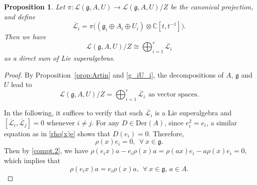 \documentclass[12pt]{article}
\numberwithin{equation}{section}
\newtheorem{proposition}[theorem]{Proposition}
\theoremstyle{definition}
\theoremstyle{plain}
\newcommand{\bC}{\ensuremath{\mathbb{C}}}
\newcommand{\fg}{\mathfrak{g}}
\newcommand{\Der}{\mathrm{Der }}
\newcommand{\cL}{\ensuremath{\mathcal{L}}}
\begin{document}
\begin{proposition}\label{prop:decom.BMS}
    Let $\pi:\cL(\fg,A,U)\rightarrow\cL(\fg,A,U)/Z$ be the canonical projection, and define
    \begin{equation*}
        \overline{\cL}_i=\pi\big((\fg_i\oplus A_i\oplus U_i)\otimes\bC[t,t^{-1}]\big).
    \end{equation*}
    Then we have
    \begin{equation*}
        \cL(\fg,A,U)/Z\cong\bigoplus_{i=1}^r\overline{\cL}_i
    \end{equation*}
    as a direct sum of Lie superalgebras.
\end{proposition}
\begin{proof}
    By Proposition~\ref{prop:Artin} and \eqref{g_iU_i}, the decompositions of $A$, $\fg$ and $U$ lead to
    \begin{equation*}
        \cL(\fg,A,U)/Z=\bigoplus_{i=1}^{r}\overline{\cL}_i\ \ \text{as vector spaces.}
    \end{equation*}
    
    In the following, it suffices to verify that each $\overline{\cL}_i$ is a Lie superalgebra and $[\overline{\cL}_i,\overline{\cL}_j]=0$ whenever $i\neq j$. For any $D\in\Der(A)$, since $e_i^2=e_i$, a similar equation as in \eqref{rho(x)e} shows that $D(e_i)=0$. Therefore,
    \begin{equation}\label{rho(x)e_i}
        \rho(x)e_i=0,\ \ \forall\ x\in\fg.
    \end{equation}
    Then by \eqref{compt.2}, we have $\rho(e_ix)a-e_i\rho(x)a=\rho(ax)e_i-a\rho(x)e_i=0$, which implies that
    \begin{equation}\label{rho.linear}
        \rho(e_ix)a=e_i\rho(x)a,\ \ \forall\ x\in\fg,\, a\in A.
    \end{equation}
    

\end{proof}
\end{document}
